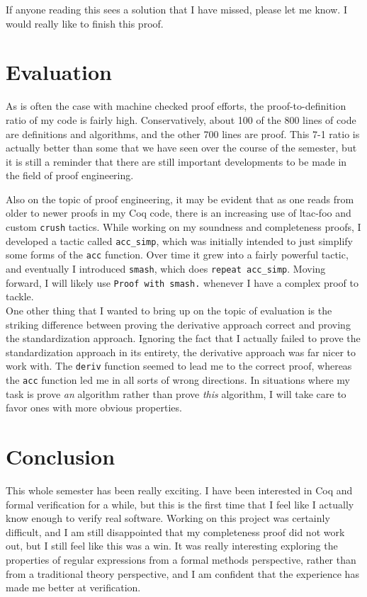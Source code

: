 \documentclass{article}
\newcommand{\coq}[1]{\texttt{#1}}
\begin{document}
If anyone reading this sees a solution that I have missed, please let me know. I
would really like to finish this proof.

\section{Evaluation} \label{eval}
As is often the case with machine checked proof efforts, the
proof-to-definition ratio of my code is fairly high. Conservatively, about
100 of the 800 lines of code are definitions and algorithms, and the other 700
lines are proof. This 7-1 ratio is actually better than some that we have seen
over the course of the semester, but it is still a reminder that there are still
important developments to be made in the field of proof engineering.

Also on the topic of proof engineering, it may be evident that as one reads from
older to newer proofs in my Coq code, there is an increasing use of ltac-foo and
custom \coq{crush} tactics. While working on my soundness and completeness
proofs, I developed a tactic called \coq{acc_simp}, which was initially intended
to just simplify some forms of the \coq{acc} function. Over time it grew into a
fairly powerful tactic, and eventually I introduced \coq{smash}, which does
\coq{repeat acc_simp}. Moving forward, I will likely use \coq{Proof with smash.}
whenever I have a complex proof to tackle.
\\

One other thing that I wanted to bring up on the topic of evaluation is the
striking difference between proving the derivative approach correct and proving
the standardization approach. Ignoring the fact that I actually failed to prove
the standardization approach in its entirety, the derivative approach was far
nicer to work with. The \coq{deriv} function seemed to lead me to the correct
proof, whereas the \coq{acc} function led me in all sorts of wrong directions.
In situations where my task is prove \emph{an} algorithm rather than prove
\emph{this} algorithm, I will take care to favor ones with more obvious
properties.

\section{Conclusion} \label{conclusion}
This whole semester has been really exciting. I have been interested in Coq and
formal verification for a while, but this is the first time that I feel like I
actually know enough to verify real software. Working on this project was
certainly difficult, and I am still disappointed that my completeness proof did
not work out, but I still feel like this was a win. It was really interesting
exploring the properties of regular expressions from a formal methods
perspective, rather than from a traditional theory perspective, and I am
confident that the experience has made me better at verification.

{}

\end{document}
